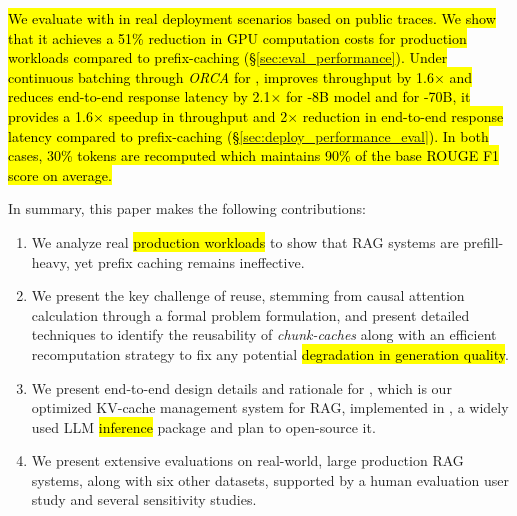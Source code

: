 \hl{We evaluate \sys with \llama in real deployment scenarios based on public traces. We show that it achieves a 51\% reduction in GPU computation costs for production workloads compared to prefix-caching (\S\ref{sec:eval_performance}). Under continuous batching through \textit{ORCA} for \X, \sys improves throughput by 1.6$\times$ and reduces end-to-end response latency by 2.1$\times$ for -8B model and for -70B, it provides a 1.6$\times$ speedup in throughput and 2$\times$ reduction in end-to-end response latency compared to prefix-caching (\S\ref{sec:deploy_performance_eval}). In both cases, 30\% tokens are recomputed which maintains 90\% of the base ROUGE F1 score on average.}

In summary, this paper makes the following contributions:
\begin{enumerate}

    \item We analyze real \hl{production workloads} to show that RAG systems are prefill-heavy, yet prefix caching remains ineffective.
    
    
    \item We present the key challenge of reuse, stemming from causal attention calculation through a formal problem formulation, and present detailed techniques to identify the reusability of \textit{chunk-caches} along with an efficient recomputation strategy to fix any potential \hl{degradation in generation quality}.  
    
    \item We present end-to-end design details and rationale for \sys, which is our optimized KV-cache management system for RAG, implemented in \vllm,
    a widely used LLM \hl{inference} package and plan to open-source it. 
    
    \item We present extensive evaluations on real-world, large production RAG systems, along with six other datasets, supported by a human evaluation user study and several sensitivity studies.
\end{enumerate}

